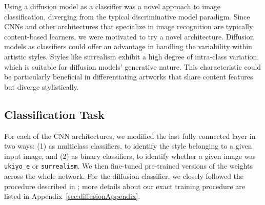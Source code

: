 \documentclass[twocolumn]{article}
\begin{document}
Using a diffusion model as a classifier was a novel approach to image classification, diverging from the typical discriminative model paradigm. Since CNNs and other architectures that specialize in image recognition are typically content-based learners, we were motivated to try a novel architecture. Diffusion models as classifiers could offer an advantage in handling the variability within artistic styles. Styles like surrealism exhibit a high degree of intra-class variation, which is suitable for diffusion models' generative nature. This characteristic could be particularly beneficial in differentiating artworks that share content features but diverge stylistically.




\subsection{Classification Task}

For each of the CNN architectures, we modified the last fully connected layer in two ways: (1) as multiclass classifiers, to identify the style belonging to a given input image, and (2) as binary classifiers, to identify whether a given image was \verb|ukiyo_e| or \verb|surrealism|. We then fine-tuned pre-trained versions of the weights across the whole network. For the diffusion classifier, we closely followed the procedure described in \cite{liYourDiffusionModel}; more details about our exact training procedure are listed in Appendix~\ref{sec:diffusionAppendix}.
\end{document}
